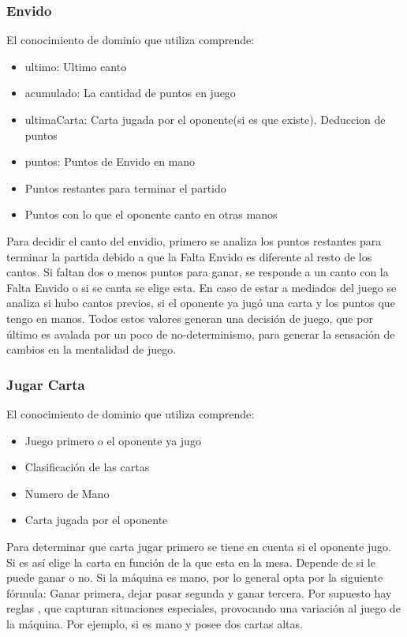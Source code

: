 \documentclass[12pt,a4paper]{article}
\begin{document}
\subsubsection{Envido}
El conocimiento de dominio que utiliza comprende:
\begin{itemize}
\item ultimo: Ultimo canto 
\item acumulado: La cantidad de puntos en juego
\item ultimaCarta: Carta jugada por el oponente(si es que existe). Deduccion de puntos
\item puntos: Puntos de Envido en mano
\item Puntos restantes para terminar el partido
\item Puntos con lo que el oponente canto en otras manos
\end{itemize}

Para decidir el canto del envidio, primero se analiza los puntos restantes para terminar la partida debido a que la Falta Envido es diferente al 
resto de los cantos. Si faltan dos o menos puntos para ganar, se responde a un canto con la Falta Envido o si se canta se elige esta.
En caso de estar a mediados del juego se analiza si hubo cantos previos, si el oponente ya jug\'o una carta y los puntos que tengo en manos. 
Todos estos valores generan una decisi\'on de juego, que por \'ultimo es avalada por un poco de  no-determinismo, para generar la sensaci\'on 
de cambios en la mentalidad de juego. 




\subsubsection{Jugar Carta}
El conocimiento de dominio que utiliza comprende:
\begin{itemize}
\item Juego primero o  el oponente ya jugo
\item Clasificaci\'on de las cartas
\item Numero de Mano
\item Carta jugada por el oponente
\end{itemize}

Para determinar que carta jugar primero se tiene en cuenta si el oponente jugo. Si es as\'i elige la carta en 
funci\'on de la que esta en la mesa. Depende de si le puede ganar o no.
Si la m\'aquina es mano, por lo general opta por la siguiente f\'ormula: Ganar primera, dejar pasar segunda y ganar tercera. 
Por supuesto hay reglas , que capturan situaciones especiales, provocando una variaci\'on al juego de la m\'aquina. Por ejemplo, si es mano y posee dos cartas altas.
\end{document}
